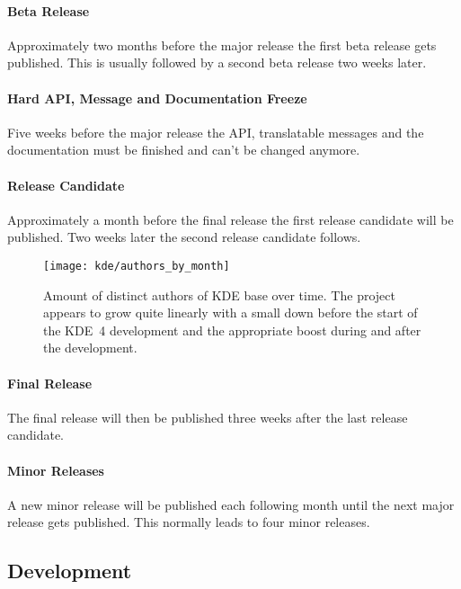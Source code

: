 \paragraph{Beta Release}

Approximately two months before the major release the first beta release gets
published. This is usually followed by a second beta release two weeks later.

\paragraph{Hard API, Message and Documentation Freeze}

Five weeks before the major release the \ac{API}, translatable messages and the
documentation must be finished and can't be changed anymore.

\paragraph{Release Candidate}

Approximately a month before the final release the first release candidate will
be published. Two weeks later the second release candidate follows.

\begin{figure}[htbp]
  \centering
  \texttt{[image: kde/authors\_by\_month]}
  \caption[Authors by month, KDE]
  {Amount of distinct authors of KDE base over time. The project appears to
    grow quite linearly with a small down before the start of the KDE~4
    development and the appropriate boost during and after the development.}
\end{figure}

\paragraph{Final Release}

The final release will then be published three weeks after the last release
candidate.

\paragraph{Minor Releases}

A new minor release will be published each following month until the next major
release gets published. This normally leads to four minor releases.


\subsection{Development} %

